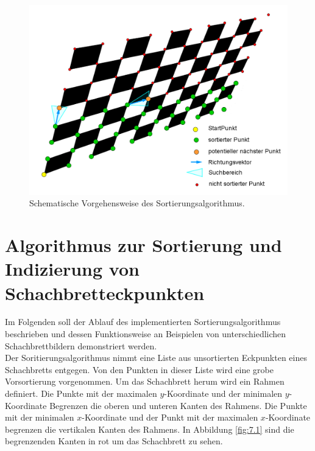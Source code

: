 

\begin{figure}[!htb]
	\centering
	\includegraphics[width=0.7\linewidth]{images/VerzeichnetesSchachbretFunktion.png}
	\caption[Funktionsübersicht des Sortieralgorithmus]{Schematische Vorgehensweise des Sortierungsalgorithmus.}
	\label{fig:UebersichtSortierungsAlg}
\end{figure}
\pagebreak



\section{Algorithmus zur Sortierung und Indizierung von Schachbretteckpunkten}

Im Folgenden soll der Ablauf des implementierten Sortierungsalgorithmus beschrieben und dessen Funktionsweise an Beispielen von unterschiedlichen Schachbrettbildern demonstriert werden.\\

Der Soritierungsalgorithmus nimmt eine Liste aus unsortierten Eckpunkten eines Schachbretts entgegen. Von den Punkten in dieser Liste wird eine grobe Vorsortierung vorgenommen. Um das Schachbrett herum wird ein Rahmen definiert. Die Punkte mit der maximalen $y$-Koordinate und der minimalen $y$-Koordinate Begrenzen die oberen und unteren Kanten des Rahmens. Die Punkte mit der minimalen $x$-Koordinate und der Punkt mit der maximalen $x$-Koordinate begrenzen die vertikalen Kanten des Rahmens. In Abbildung \ref{fig:7.1} sind die begrenzenden Kanten in rot um das Schachbrett zu sehen.\\

